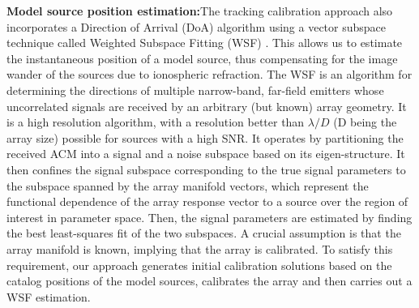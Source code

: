 \documentclass{aa}
\begin{document}
\textbf{Model source position estimation:}The tracking calibration approach also
incorporates  a Direction  of Arrival  (DoA) algorithm  using a  vector subspace
technique  called Weighted  Subspace Fitting  (WSF) \citep{viberg1991detection}.
This allows  us to estimate the  instantaneous position of a  model source, thus
compensating  for   the  image  wander   of  the  sources  due   to  ionospheric
refraction. The WSF  is an algorithm for determining  the directions of multiple
narrow-band, far-field  emitters whose uncorrelated  signals are received  by an
arbitrary (but known) array geometry. It  is a high resolution algorithm, with a
resolution better than $\lambda/D$ (D being the array size) possible for sources
with a high SNR. It operates by  partitioning the received ACM into a signal and
a  noise subspace based  on its  eigen-structure.  It  then confines  the signal
subspace corresponding to the true  signal parameters to the subspace spanned by
the array  manifold vectors,  which represent the  functional dependence  of the
array  response vector  to a  source over  the region  of interest  in parameter
space.  Then,  the   signal  parameters  are  estimated  by   finding  the  best
least-squares fit of  the two subspaces. A crucial assumption  is that the array
manifold  is known,  implying that  the array  is calibrated.   To  satisfy this
requirement, our  approach generates initial calibration solutions  based on the
catalog positions  of the model sources,  calibrates the array  and then carries
out  a  WSF  estimation. 

\end{document}
